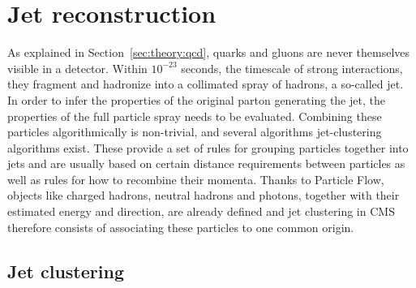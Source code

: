 \section{Jet reconstruction}
\label{sec:objreco:jets}
As explained in Section~\ref{sec:theory:qcd}, quarks and gluons are never themselves visible in a detector. Within $10^{-23}$ seconds, the timescale of strong interactions, they fragment and hadronize into a collimated spray of hadrons, a so-called jet. In order to infer the properties of the original parton generating the jet, the properties of the full particle spray needs to be evaluated.
Combining these particles algorithmically is non-trivial, and several algorithms jet-clustering algorithms exist.
These provide a set of rules for grouping particles together into jets and are usually based on certain distance requirements between particles as well as rules for how to recombine their momenta.
Thanks to Particle Flow, objects like charged hadrons, neutral hadrons and photons, together with their estimated energy and direction, are already defined and jet clustering in CMS therefore consists of associating these particles to one common origin.


\subsection{Jet clustering}

